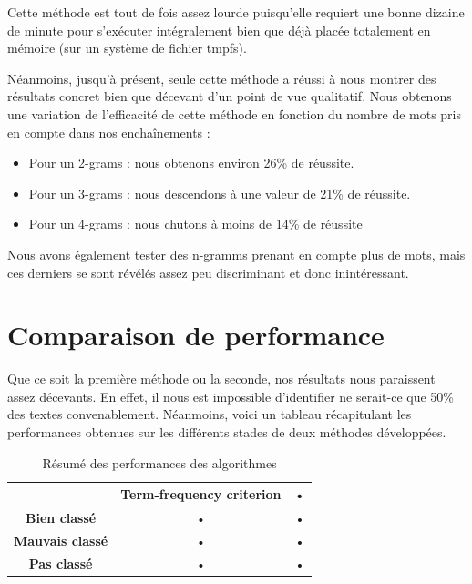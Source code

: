 \documentclass[a4paper,12pt]{report}
\begin{document}
Cette méthode est tout de fois assez lourde puisqu'elle requiert une bonne dizaine de minute pour s'exécuter intégralement bien que déjà placée totalement en mémoire (sur un système de fichier tmpfs). 

Néanmoins, jusqu'à présent, seule cette méthode a réussi à nous montrer des résultats concret bien que décevant d'un point de vue qualitatif. Nous obtenons une variation de l'efficacité de cette méthode en fonction du nombre de mots pris en compte dans nos enchaînements :

\begin{itemize}
\item{Pour un 2-grams : nous obtenons environ 26\% de réussite.}
\item{Pour un 3-grams : nous descendons à une valeur de 21\% de réussite.}
\item{Pour un 4-grams : nous chutons à moins de 14\% de réussite}
\end{itemize}

Nous avons également tester des n-gramms prenant en compte plus de mots, mais ces derniers se sont révélés assez peu discriminant et donc inintéressant.



\section{Comparaison de performance}

Que ce soit la première méthode ou la seconde, nos résultats nous paraissent assez décevants. En effet, il nous est impossible d'identifier ne serait-ce que 50\% des textes convenablement. Néanmoins, voici un tableau récapitulant les performances obtenues sur les différents stades de deux méthodes développées.



\begin{table}[H]
\centering
\begin{tabular}{|c|c|c|}
\hline 
 & \textbf{Term-frequency criterion} & • \\ 
\hline 
\textbf{Bien classé} & • & • \\ 
\hline 
\textbf{Mauvais classé} & • & • \\ 
\hline 
\textbf{Pas classé} & • & • \\ 
\hline 
\end{tabular} 
\caption{Résumé des performances des algorithmes}
\end{table}
\end{document}
